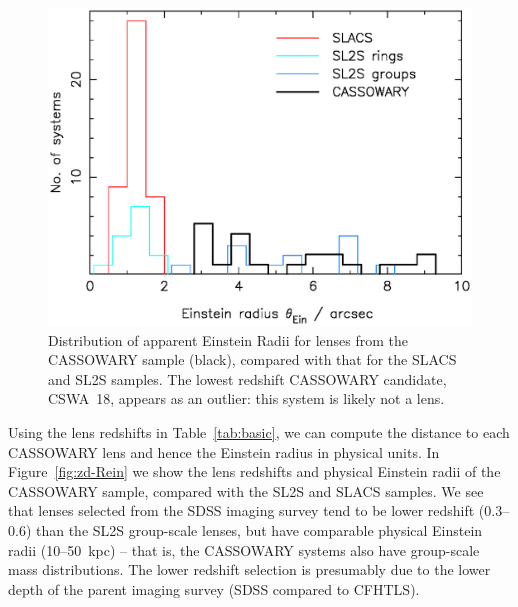 \documentclass[iop]{emulateapj}
\begin{document}
\begin{figure}[!ht]
	\centering\includegraphics[width=\linewidth]{figs/theinhist.ps}
  \caption{Distribution of apparent Einstein Radii for lenses from the CASSOWARY
   sample (black), compared with that for the SLACS and SL2S samples. The lowest
   redshift CASSOWARY candidate, CSWA~18, appears as an outlier: this system is
   likely not a lens.}
  \label{fig:einstein_hist}
\end{figure}

Using the lens redshifts in Table~\ref{tab:basic}, we can compute the distance
to each CASSOWARY lens and hence the Einstein radius in physical units. In
Figure~\ref{fig:zd-Rein} we show the lens redshifts and physical Einstein radii
of the CASSOWARY sample, compared with the SL2S and SLACS samples. We see that 
lenses selected from the SDSS imaging survey tend to be lower redshift
(0.3--0.6)  than  the SL2S group-scale lenses, but have comparable physical
Einstein radii (10--50~kpc)  -- that  is, the CASSOWARY systems also have
group-scale mass distributions.  The lower redshift selection is presumably due
to the lower depth of the parent imaging survey (SDSS compared to CFHTLS). 
\end{document}
